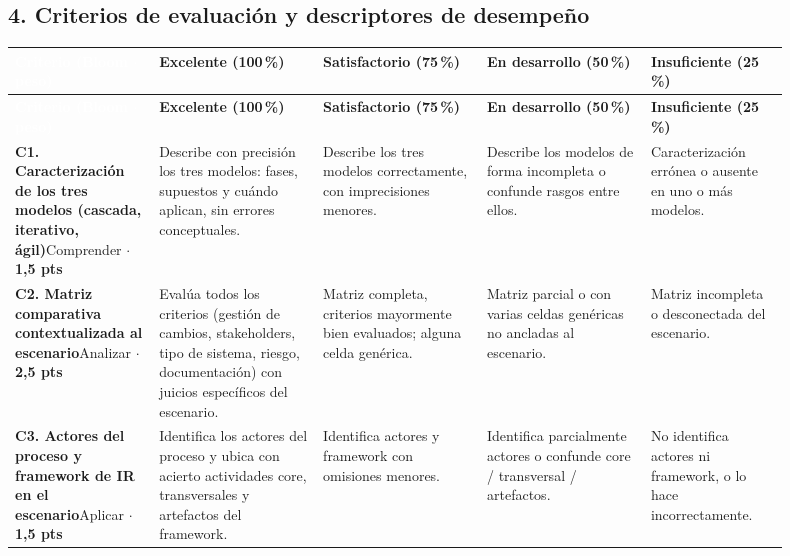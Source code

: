 \documentclass[11pt]{article}
\newcommand{\bhdr}[1]{\cellcolor{midblue}\textcolor{white}{\textbf{#1}}}
\renewcommand{\arraystretch}{1.25}
\begin{document}
\begin{landscape}
\section*{\textcolor{utegreendk}{4. Criterios de evaluación y descriptores de desempeño}}

\renewcommand{\arraystretch}{1.3}
\begin{longtable}{|L{0.165\linewidth}|L{0.19\linewidth}|L{0.19\linewidth}|L{0.19\linewidth}|L{0.165\linewidth}|}
\hline
\bhdr{Criterio (Bloom $\cdot$ peso)} &
\textbf{Excelente (100\,\%)} &
\textbf{Satisfactorio (75\,\%)} &
\textbf{En desarrollo (50\,\%)} &
\textbf{Insuficiente (25\,\%)}\\
\hline
\endfirsthead
\hline
\bhdr{Criterio (Bloom $\cdot$ peso)} &
\textbf{Excelente (100\,\%)} &
\textbf{Satisfactorio (75\,\%)} &
\textbf{En desarrollo (50\,\%)} &
\textbf{Insuficiente (25\,\%)}\\
\hline
\endhead

\textbf{C1. Caracterización de los tres modelos (cascada, iterativo, ágil)}\newline{}Comprender $\cdot$ \textbf{1,5 pts} &
Describe con precisión los tres modelos: fases, supuestos y cuándo aplican, sin errores conceptuales. &
Describe los tres modelos correctamente, con imprecisiones menores. &
Describe los modelos de forma incompleta o confunde rasgos entre ellos. &
Caracterización errónea o ausente en uno o más modelos.\\
\hline

\textbf{C2. Matriz comparativa contextualizada al escenario}\newline{}Analizar $\cdot$ \textbf{2,5 pts} &
Evalúa todos los criterios (gestión de cambios, stakeholders, tipo de sistema, riesgo, documentación) con juicios específicos del escenario. &
Matriz completa, criterios mayormente bien evaluados; alguna celda genérica. &
Matriz parcial o con varias celdas genéricas no ancladas al escenario. &
Matriz incompleta o desconectada del escenario.\\
\hline

\textbf{C3. Actores del proceso y framework de IR en el escenario}\newline{}Aplicar $\cdot$ \textbf{1,5 pts} &
Identifica los actores del proceso y ubica con acierto actividades core, transversales y artefactos del framework. &
Identifica actores y framework con omisiones menores. &
Identifica parcialmente actores o confunde core / transversal / artefactos. &
No identifica actores ni framework, o lo hace incorrectamente.\\
\hline


\end{longtable}
\end{landscape}
\end{document}
